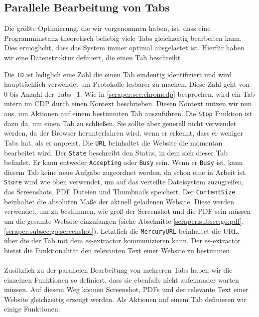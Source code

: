 \subsection{Parallele Bearbeitung von Tabs}
Die größte Optimierung, die wir vorgenommen haben, ist, dass eine Programminstanz theoretisch beliebig viele Tabs gleichzeitig bearbeiten kann. Dies ermöglicht, dass das System immer optimal ausgelastet ist. Hierfür haben wir eine Datenstruktur definiert, die einen Tab beschreibt. 
Die \verb|ID| ist lediglich eine Zahl die einen Tab eindeutig identifiziert und wird hauptsächlich verwendet um Protokolle lesbarer zu machen. Diese Zahl geht von $0$ bis Anzahl der Tabs$-1$. 
Wie in \autoref{scraper:sec:chromedp} besprochen, wird ein Tab intern im CDP durch einen Kontext beschrieben. Diesen Kontext nutzen wir nun aus, um Aktionen auf einem bestimmten Tab auszuführen. Die \verb|Stop| Funktion ist dazu da, um einen Tab zu schließen. Sie sollte aber generell nicht verwendet werden, da der Browser herunterfahren wird, wenn er erkennt, dass er weniger Tabs hat, als er anpreist. Die \verb|URL| beinhaltet die Website die momentan bearbeitet wird. Der \verb|State| beschreibt den Status, in dem sich dieser Tab befindet. Er kann entweder \verb|Accepting| oder \verb|Busy| sein. Wenn er \verb|Busy| ist, kann diesem Tab keine neue Aufgabe zugeordnet werden, da schon eine in Arbeit ist. \verb|Store| wird wie oben verwendet, um auf das verteilte Dateisystem zuzugreifen, das Screenshots, PDF Dateien und Thumbnails speichert. Der \verb|ContentSize| beinhaltet die absoluten Maße der aktuell geladenen Website. Diese werden verwendet, um zu bestimmen, wie groß der Screenshot und die PDF sein müssen um die gesamte Website einzufangen (siehe Abschnitte \ref{scraper:subsec:go:pdf}, \ref{scraper:subsec:go:screenshot}). Letztlich die \verb|MercuryURL| beinhaltet die URL, über die der Tab mit dem es-extractor kommunizieren kann. Der es-extractor bietet die Funktionalität den relevanten Text einer Website zu bestimmen. \\ \\ Zusätzlich zu der parallelen Bearbeitung von mehreren Tabs haben wir die einzelnen Funktionen so definiert, dass sie ebenfalls nicht aufeinander warten müssen. Auf diesem Weg können Screenshot, PDFs und der relevante Text einer Website gleichzeitig erzeugt werden. Als Aktionen auf einem Tab definieren wir einige Funktionen:

